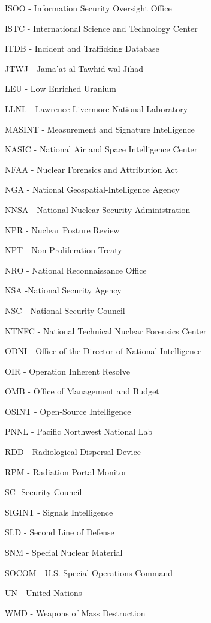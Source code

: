 \documentclass{report}
\begin{document}
{ISOO - Information Security Oversight Office

ISTC - International Science and Technology Center

ITDB - Incident and Trafficking Database


JTWJ - Jama'at al-Tawhid wal-Jihad 

LEU - Low Enriched Uranium


LLNL - Lawrence Livermore National Laboratory

MASINT - Measurement and Signature Intelligence 

NASIC - National Air and Space Intelligence Center 

NFAA - Nuclear Forensics and Attribution Act

NGA - National Geospatial-Intelligence Agency 

NNSA - National Nuclear Security Administration 

NPR - Nuclear Posture Review

NPT - Non-Proliferation Treaty

NRO - National Reconnaissance Office

NSA -National Security Agency

NSC - National Security Council  

NTNFC - National Technical Nuclear Forensics Center

ODNI - Office of the Director of National Intelligence

OIR - Operation Inherent Resolve

OMB - Office of Management and Budget

OSINT - Open-Source Intelligence

PNNL - Pacific Northwest National Lab

RDD - Radiological Dispersal Device

RPM - Radiation Portal Monitor

SC- Security Council

SIGINT - Signals Intelligence 

SLD - Second Line of Defense

SNM - Special Nuclear Material

SOCOM - U.S. Special Operations Command

UN - United Nations

WMD - Weapons of Mass Destruction}

\newpage


\thispagestyle{empty}

\vspace*{\fill}
\end{document}
